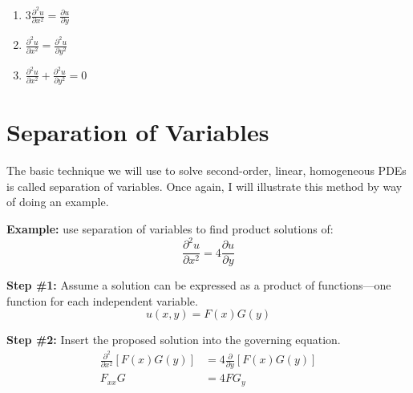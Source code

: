 \begin{enumerate}
\item $3\frac{\partial^2 u}{\partial x^2} = \frac{\partial u}{\partial y} $

\vspace{0.5cm}

\item $\frac{\partial^2 u}{\partial x^2} = \frac{\partial^2 u}{\partial y^2}$

\vspace{0.5cm}

\item $\frac{\partial^2 u}{\partial x^2} + \frac{\partial^2 u}{\partial y^2} = 0$
\end{enumerate}

\section{Separation of Variables}
The basic technique we will use to solve second-order, linear, homogeneous PDEs is called separation of variables.  Once again, I will illustrate this method by way of doing an example.

\vspace{0.25cm}

\noindent\textbf{Example:} use separation of variables to find product solutions of:
\begin{equation}
\frac{\partial^2 u}{\partial x^2} = 4\frac{\partial u}{\partial y}
\label{eq:lec21-ex}
\end{equation}

\noindent\textbf{Step \#1:} Assume a solution can be expressed as a product of functions---one function for each independent variable.  
\begin{equation*}
u(x,y) = F(x)G(y)
\end{equation*}

\vspace{3.5cm}

\noindent\textbf{Step \#2:} Insert the proposed solution into the governing equation.
\begin{align*}
\frac{\partial^2}{\partial x^2}\left[F(x)G(y)\right] &= 4 \frac{\partial}{\partial y}\left[F(x)G(y)\right] \\
F_{xx}G &= 4 FG_{y}
\end{align*}

\vspace{0.5cm}


